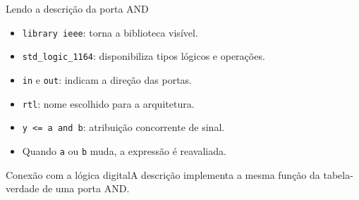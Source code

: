 \begin{frame}[t]{Lendo a descrição da porta AND}
\begin{itemize}
\item \texttt{library ieee}: torna a biblioteca visível.
\item \texttt{std\_logic\_1164}: disponibiliza tipos lógicos e operações.
\item \texttt{in} e \texttt{out}: indicam a direção das portas.
\item \texttt{rtl}: nome escolhido para a arquitetura.
\item \texttt{y <= a and b}: atribuição concorrente de sinal.
\item Quando \texttt{a} ou \texttt{b} muda, a expressão é reavaliada.
\end{itemize}\begin{block}{Conexão com a lógica digital}A descrição implementa a mesma função da tabela-verdade de uma porta AND.\end{block}
\end{frame}
